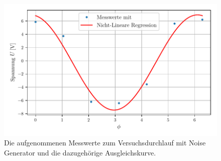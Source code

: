 \begin{figure}
      \centering
      \includegraphics[width=\textwidth]{bilder/plot2.pdf}
      \caption{Die aufgenommenen Messwerte zum Versuchsdurchlauf mit Noise Generator und die dazugehörige Ausgleichskurve.}
      \label{fig:mit_noise}
\end{figure}

